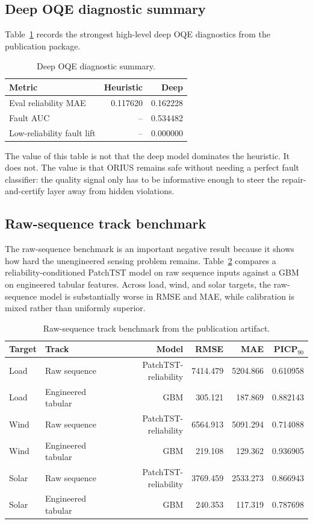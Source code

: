 \subsection{Deep OQE diagnostic summary}
Table~\ref{tab:prof-deep-oqe-summary} records the strongest high-level deep OQE
diagnostics from the publication package.

\begin{table}[t]
\centering
\small
\caption{Deep OQE diagnostic summary.}
\label{tab:prof-deep-oqe-summary}
\begin{tabular}{lrr}
\toprule
\textbf{Metric} & \textbf{Heuristic} & \textbf{Deep} \\
\midrule
Eval reliability MAE & 0.117620 & 0.162228 \\
Fault AUC & -- & 0.534482 \\
Low-reliability fault lift & -- & 0.000000 \\
\bottomrule
\end{tabular}
\end{table}

\noindent The value of this table is not that the deep model dominates the
heuristic.  It does not.  The value is that ORIUS remains safe without needing a
perfect fault classifier: the quality signal only has to be informative enough
to steer the repair-and-certify layer away from hidden violations.

\subsection{Raw-sequence track benchmark}
The raw-sequence benchmark is an important negative result because it shows how
hard the unengineered sensing problem remains.  Table~\ref{tab:prof-raw-seq}
compares a reliability-conditioned PatchTST model on raw sequence inputs against
a GBM on engineered tabular features.  Across load, wind, and solar targets, the
raw-sequence model is substantially worse in RMSE and MAE, while calibration is
mixed rather than uniformly superior.

\begin{table}[t]
\centering
\small
\caption{Raw-sequence track benchmark from the publication artifact.}
\label{tab:prof-raw-seq}
\begin{tabular}{llrrrr}
\toprule
\textbf{Target} & \textbf{Track} & \textbf{Model} & \textbf{RMSE} & \textbf{MAE} & \textbf{PICP$_{90}$} \\
\midrule
Load & Raw sequence & PatchTST-reliability & 7414.479 & 5204.866 & 0.610958 \\
Load & Engineered tabular & GBM & 305.121 & 187.869 & 0.882143 \\
Wind & Raw sequence & PatchTST-reliability & 6564.913 & 5091.294 & 0.714088 \\
Wind & Engineered tabular & GBM & 219.108 & 129.362 & 0.936905 \\
Solar & Raw sequence & PatchTST-reliability & 3769.459 & 2533.273 & 0.866943 \\
Solar & Engineered tabular & GBM & 240.353 & 117.319 & 0.787698 \\
\bottomrule
\end{tabular}
\end{table}

